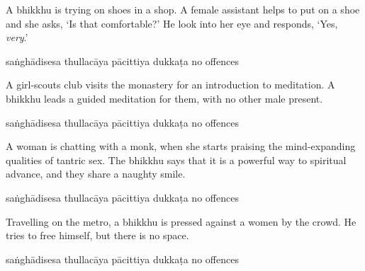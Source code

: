 \begin{exam}{\autoExamName}
\begin{problem*}
\begin{parts}
    \bigskip

  \item A bhikkhu is trying on shoes in a shop. A female assistant helps to put
    on a shoe and she asks, `Is that comfortable?' He look into her eye and
    responds, `Yes, \textit{very}.'

    \bigskip

    \begin{answers}{5}
      \bChoices
       saṅghādisesa\eAns
       thullacāya\eAns
       pācittiya\eAns
       dukkaṭa\eAns
       no offences\eAns
      \eChoices
    \end{answers}

  \item A girl-scouts club visits the monastery for an introduction to
    meditation. A bhikkhu leads a guided meditation for them, with no other male
    present.

    \bigskip

    \begin{answers}{5}
      \bChoices
       saṅghādisesa\eAns
       thullacāya\eAns
       pācittiya\eAns
       dukkaṭa\eAns
       no offences\eAns
      \eChoices
    \end{answers}

    \bigskip

  \item A woman is chatting with a monk, when she starts praising the
    mind-expanding qualities of tantric sex. The bhikkhu says that it is a
    powerful way to spiritual advance, and they share a naughty smile.

    \bigskip

    \begin{answers}{5}
      \bChoices
       saṅghādisesa\eAns
       thullacāya\eAns
       pācittiya\eAns
       dukkaṭa\eAns
       no offences\eAns
      \eChoices
    \end{answers}

    \bigskip

  \item Travelling on the metro, a bhikkhu is pressed against a women by the
    crowd. He tries to free himself, but there is no space.

    \bigskip

    \begin{answers}{5}
      \bChoices
       saṅghādisesa\eAns
       thullacāya\eAns
       pācittiya\eAns
       dukkaṭa\eAns
       no offences\eAns
      \eChoices
    \end{answers}


\end{parts}
\end{problem*}
\end{exam}
